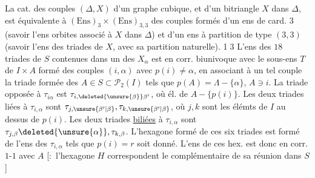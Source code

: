 La cat. des couples $(\Delta,X)$ d'un graphe cubique, et d'un bitriangle $X$ dans $\Delta$, est équivalente à    $(\mathrm{Ens})_3\times(\mathrm{Ens})_{3,3}$ des couples formés d'un ens de card. $3$ (savoir l'ens    orbites associé à $X$ dans $\Delta$) et d'un ens à partition de type $(3,3)$ (savoir l'ens des triades de $X$, \deleted{\unsure{\}|)}} avec sa partition naturelle).
\textcircled{\scriptsize 13} L'ens des $18$ triades de $S$ contenues dans un des $X_\alpha$ est en corr. biunivoque avec  le sous-ens $T$ de $I\times A$ formé des couples $(i,\alpha)$ avec $p(i)\ne\alpha$, en associant à un tel couple la triade  formée des $A\in S\subset\mathcal P_2(I)$ tels que $p(A)=\Lambda-\{\alpha\}$, $A\ni i$.  La triade opposée à $\tau_{i\alpha}$ est $\tau_{i,\deleted{\unsure{\beta}}\beta'}$, où    él. de  $A-\{p(i)\}$. Les deux triades liées à $\tau_{i,\alpha}$ sont $\tau_{j,\unsure{\beta'|\beta}},\tau_{k,\unsure{\beta'|\beta}}$, où $j,k$ sont les  élémts de  $I$ au dessus de $p(i)$. Les deux triades \uline{biliées} à $\tau_{i,\alpha}$ sont $\tau_{j,\beta}\deleted{\unsure{\alpha}},\tau_{k,\beta}$. L'hexagone formé de ces six triades est formé de l'ens des $\tau_{i,\alpha}$ tels que $p(i)=r$ soit donné. L'ens de ces hex. est donc en corr. $1$-$1$ avec $A$ [$:$ l'hexagone $H$ correspondent le complémentaire de sa réunion dans $S$]


